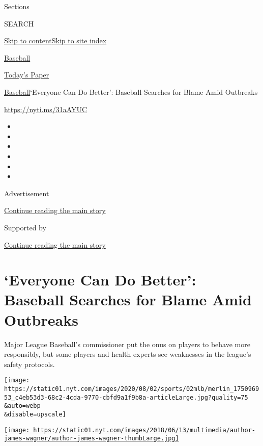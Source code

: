 Sections

SEARCH

\protect\hyperlink{site-content}{Skip to
content}\protect\hyperlink{site-index}{Skip to site index}

\href{https://www.nytimes.com/section/sports/baseball}{Baseball}

\href{https://myaccount.nytimes.com/auth/login?response_type=cookie\&client_id=vi}{}

\href{https://www.nytimes.com/section/todayspaper}{Today's Paper}

\href{/section/sports/baseball}{Baseball}\textbar{}`Everyone Can Do
Better': Baseball Searches for Blame Amid Outbreaks

\url{https://nyti.ms/31aAYUC}

\begin{itemize}
\item
\item
\item
\item
\item
\item
\end{itemize}

Advertisement

\protect\hyperlink{after-top}{Continue reading the main story}

Supported by

\protect\hyperlink{after-sponsor}{Continue reading the main story}

\hypertarget{everyone-can-do-better-baseball-searches-for-blame-amid-outbreaks}{%
\section{`Everyone Can Do Better': Baseball Searches for Blame Amid
Outbreaks}\label{everyone-can-do-better-baseball-searches-for-blame-amid-outbreaks}}

Major League Baseball's commissioner put the onus on players to behave
more responsibly, but some players and health experts see weaknesses in
the league's safety protocols.

\texttt{[image: https://static01.nyt.com/images/2020/08/02/sports/02mlb/merlin\_175096953\_c4eb53d3-68c2-4cda-9770-cbfd9a1f9b8a-articleLarge.jpg?quality=75\\\&auto=webp\\\&disable=upscale]}

\href{https://www.nytimes.com/by/james-wagner}{\texttt{[image: https://static01.nyt.com/images/2018/06/13/multimedia/author-james-wagner/author-james-wagner-thumbLarge.jpg]}}

